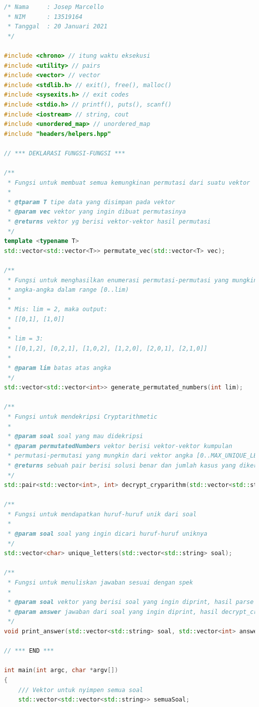 \documentclass{article}
\begin{document}
\begin{lstlisting}[caption = "main.cpp", language = c++]
/* Nama     : Josep Marcello
 * NIM      : 13519164
 * Tanggal  : 20 Januari 2021
 */

#include <chrono> // itung waktu eksekusi
#include <utility> // pairs
#include <vector> // vector
#include <stdlib.h> // exit(), free(), malloc()
#include <sysexits.h> // exit codes
#include <stdio.h> // printf(), puts(), scanf()
#include <iostream> // string, cout
#include <unordered_map> // unordered_map
#include "headers/helpers.hpp"

// *** DEKLARASI FUNGSI-FUNGSI ***

/**
 * Fungsi untuk membuat semua kemungkinan permutasi dari suatu vektor
 *
 * @tparam T tipe data yang disimpan pada vektor
 * @param vec vektor yang ingin dibuat permutasinya
 * @returns vektor yg berisi vektor-vektor hasil permutasi
 */
template <typename T>
std::vector<std::vector<T>> permutate_vec(std::vector<T> vec);

/**
 * Fungsi untuk menghasilkan enumerasi permutasi-permutasi yang mungkin dari
 * angka-angka dalam range [0..lim)
 *
 * Mis: lim = 2, maka output:
 * [[0,1], [1,0]]
 *
 * lim = 3:
 * [[0,1,2], [0,2,1], [1,0,2], [1,2,0], [2,0,1], [2,1,0]]
 *
 * @param lim batas atas angka
 */
std::vector<std::vector<int>> generate_permutated_numbers(int lim);

/**
 * Fungsi untuk mendekripsi Cryptarithmetic
 *
 * @param soal soal yang mau didekripsi
 * @param permutatedNumbers vektor berisi vektor-vektor kumpulan
 * permutasi-permutasi yang mungkin dari vektor angka [0..MAX_UNIQUE_LETTERS]
 * @returns sebuah pair berisi solusi benar dan jumlah kasus yang dikerjakan
 */
std::pair<std::vector<int>, int> decrypt_cryparithm(std::vector<std::string> soal, std::vector<std::vector<int>> permutatedNumbers);

/**
 * Fungsi untuk mendapatkan huruf-huruf unik dari soal
 *
 * @param soal soal yang ingin dicari huruf-huruf uniknya
 */
std::vector<char> unique_letters(std::vector<std::string> soal);

/**
 * Fungsi untuk menuliskan jawaban sesuai dengan spek
 *
 * @param soal vektor yang berisi soal yang ingin diprint, hasil parse parse_file()
 * @param answer jawaban dari soal yang ingin diprint, hasil decrypt_cryparithm()
 */
void print_answer(std::vector<std::string> soal, std::vector<int> answer);

// *** END ***

int main(int argc, char *argv[])
{
    /// Vektor untuk nyimpen semua soal
    std::vector<std::vector<std::string>> semuaSoal;


\end{lstlisting}
\end{document}
